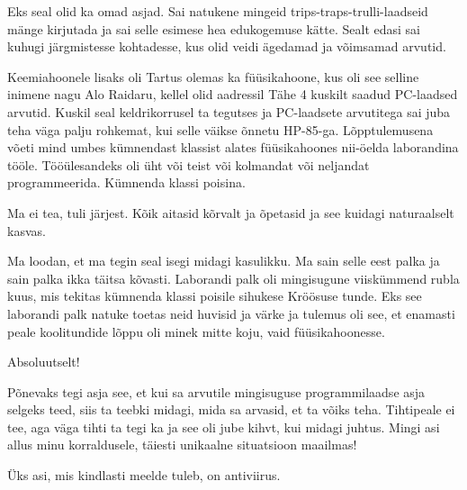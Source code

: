 
Eks seal olid ka omad asjad. Sai natukene mingeid trips-traps-trulli-laadseid 
mänge kirjutada ja sai selle esimese hea edukogemuse kätte. Sealt edasi sai 
kuhugi järgmistesse kohtadesse, kus olid  veidi ägedamad ja võimsamad arvutid.

Keemiahoonele lisaks oli Tartus olemas ka 
füüsikahoone, kus oli see selline inimene 
nagu Alo Raidaru, kellel olid aadressil Tähe 4 kuskilt 
saadud PC-laadsed arvutid. Kuskil seal keldrikorrusel ta tegutses ja 
PC-laadsete arvutitega sai juba teha väga palju rohkemat, kui selle väikse 
õnnetu HP-85-ga. Lõpptulemusena võeti mind umbes 
kümnendast klassist alates füüsikahoones nii-öelda laborandina tööle. 
Tööülesandeks oli üht või teist või kolmandat või neljandat programmeerida. 
Kümnenda klassi poisina.


Ma ei tea, tuli järjest. Kõik aitasid kõrvalt ja õpetasid ja see kuidagi 
naturaalselt kasvas.

Ma loodan, et ma tegin seal isegi midagi kasulikku. Ma sain selle eest palka ja 
sain palka ikka täitsa kõvasti. Laborandi palk oli mingisugune viiskümmend 
rubla kuus, mis tekitas kümnenda klassi poisile sihukese Kröösuse tunde. Eks 
see laborandi palk natuke toetas neid huvisid ja värke ja tulemus oli see, et 
enamasti peale koolitundide lõppu oli minek mitte koju, vaid füüsikahoonesse.


Absoluutselt!


Põnevaks tegi asja see, et kui sa arvutile mingisuguse programmilaadse asja 
selgeks teed, siis ta teebki midagi, mida sa arvasid, et ta võiks teha. 
Tihtipeale ei tee, aga väga tihti ta tegi ka ja see oli jube kihvt, kui midagi 
juhtus. Mingi asi allus  minu korraldusele, täiesti unikaalne situatsioon 
maailmas!


Üks asi, mis kindlasti meelde tuleb, on antiviirus. 


